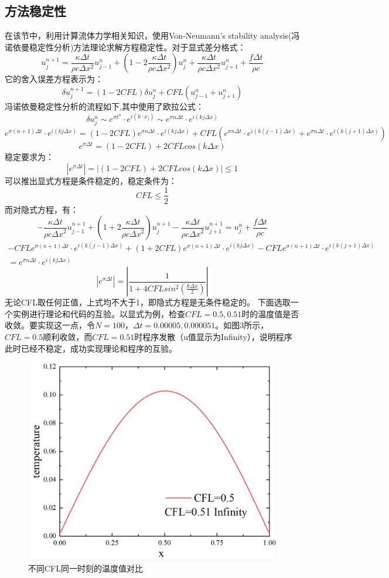 \documentclass{article}
\begin{document}
		\subsection{方法稳定性}
		在该节中，利用计算流体力学相关知识，使用Von-Neumann's stability analysis(冯诺依曼稳定性分析)方法理论求解方程稳定性。对于显式差分格式：
		$$
		u_j^{n+1}=\frac{\kappa \Delta t}{\rho  c \Delta x^2}u^{n}_{j-1}+(1-2\frac{\kappa \Delta t}{\rho  c \Delta x^2})u^{n}_{j}+\frac{\kappa \Delta t}{\rho  c \Delta x^2}u^{n}_{j+1}+\frac{f \Delta t}{\rho c}
		$$
		它的舍入误差方程表示为：
		$$
		\delta u_j^{n+1}=(1-2CFL)\delta u_j^n + CFL(u^{n}_{j-1}+u^{n}_{j+1})
		$$
		冯诺依曼稳定性分析的流程如下,其中使用了欧拉公式：
		$$
		\delta u_j^n \sim e^{\sigma t^n}\cdot e^{i(k\cdot x_j)} \sim e^{\sigma n\Delta t}\cdot e^{i(kj\Delta x)}
		$$
		$$
		e^{\sigma (n+1)\Delta t}\cdot e^{i(kj\Delta x)}=(1-2CFL)e^{\sigma n\Delta t}\cdot e^{i(kj\Delta x)} + CFL(e^{\sigma n\Delta t}\cdot e^{i(k(j-1)\Delta x)}+e^{\sigma n\Delta t}\cdot e^{i(k(j+1)\Delta x)})
		$$
		$$
		e^{\sigma \Delta t}=(1-2CFL)+2CFLcos(k \Delta x)
		$$
		稳定要求为：
		$$
		|e^{\sigma \Delta t}|=|(1-2CFL)+2CFLcos(k \Delta x)|\leq 1
		$$
		可以推出显式方程是条件稳定的，稳定条件为：
		$$
		CFL \leq \frac{1}{2}
		$$
		而对隐式方程，有：
		$$
		-\frac{\kappa \Delta t}{\rho c {\Delta x}^2}u^{n+1}_{j-1}+(1+2\frac{\kappa \Delta t}{\rho c {\Delta x}^2})u^{n+1}_j-\frac{\kappa \Delta t}{\rho c {\Delta x}^2}u^{n+1}_{j+1}=u^{n}_j+\frac{f\Delta t}{\rho c}
		$$
		$$
		\begin{aligned}
		-CFLe^{\sigma (n+1)\Delta t}\cdot e^{i(k(j-1)\Delta x)}+(1+2CFL)e^{\sigma (n+1)\Delta t}\cdot e^{i(kj\Delta x)}-CFLe^{\sigma (n+1)\Delta t}\cdot e^{i(k(j+1)\Delta x)} \\
		=e^{\sigma n\Delta t}\cdot e^{i(kj\Delta x)}
		\end{aligned}
		$$
		$$
		|e^{\sigma \Delta t}|=|\frac{1}{1+4CFLsin^2(\frac{k\Delta x}{2})}|
		$$
		无论CFL取任何正值，上式均不大于1，即隐式方程是无条件稳定的。
		下面选取一个实例进行理论和代码的互验。以显式为例，检查$CFL=0.5,0.51$时的温度值是否收敛。要实现这一点，令$N=100$，$\Delta t=0.00005,0.000051$。如图3所示，$CFL=0.5$顺利收敛，而$CFL=0.51$时程序发散（u值显示为Infinity），说明程序此时已经不稳定，成功实现理论和程序的互验。
		\begin{figure}
			\centering
			\includegraphics[width=0.7\linewidth]{screenshot003}
			\caption[]{不同CFL同一时刻的温度值对比}
			\label{fig:screenshot003}
		\end{figure}
		
\end{document}

